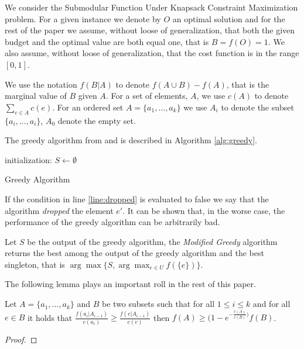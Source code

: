 We consider the Submodular Function Under
Knapsack Constraint Maximization problem.
For a given instance we denote by $O$ an optimal solution and for the rest of the 
paper we assume, without loose of generalization, that both the 
given budget and the optimal value are both equal one, that is $B = f(O) = 1$.
We also assume, without loose of generalization, 
that the cost function is in the range $[0, 1]$.
 
We use the notation $f(B|A)$ to denote $f(A \cup B) - f(A)$, that is the marginal value of $B$
given $A$. 
For a set of elements, $A$, we use $c(A)$ to denote $\sum_{e \in A}c(e)$.
For an ordered set $A = \{a_1, \dots, a_k\}$ we use $A_i$ to denote the subset 
$\{a_i, \dots, a_i\}$, $A_0$ denote the empty set. 

The greedy algorithm from \cite{khuller1999budgeted} and \cite{krause2005note}
is described in Algorithm \ref{alg:greedy}.

\begin{algorithm}[H]
\label{alg:greedy}



initialization: $S \leftarrow \emptyset$
\\
\caption{Greedy Algorithm}
\end{algorithm}
 
If the condition in line \ref{line:dropped} is evaluated to false we say that the algorithm 
\emph{dropped} the element $e'$.
It can be shown that, in the worse case, the performance of the greedy algorithm 
can be arbitrarily bad.

Let $S$ be the output of the greedy algorithm, the \emph{Modified Greedy} algorithm 
returns the best among the output of the greedy algorithm
and the best singleton, that is $\arg\max\{S, \displaystyle{\arg\max_{e \in U}}f(\{e\})\}$.  

The following lemma plays an important roll in the rest of this paper.

\begin{lemma}
Let $A = \{a_1, \dots, a_k\}$ and $B$ be two subsets such that for all $1 \leq i \leq k$ 
and for all $e \in B$ it holds that 
$\frac{f(a_i|A_{i-1})}{c(a_i)} \geq \frac{f(e|A_{i-1})}{c(e)}$
then $f(A) \geq (1 - e^{-\frac{c(A)}{c(B)})}f(B)$.
\end{lemma} 

\begin{proof}
\end{proof}






